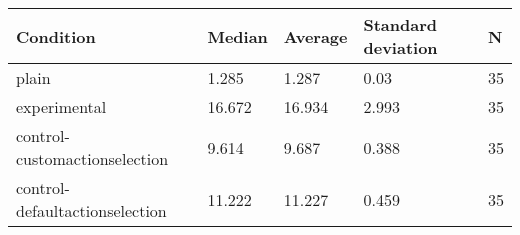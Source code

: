 \begin{center}
\begin{tabular}{|l|l|l|l|l|}
\hline
Condition & Median & Average & Standard deviation & N \\
\hline
plain & 1.285 & 1.287 & 0.03 & 35 \\
experimental & 16.672 & 16.934 & 2.993 & 35 \\
control-customactionselection & 9.614 & 9.687 & 0.388 & 35 \\
control-defaultactionselection & 11.222 & 11.227 & 0.459 & 35 \\
\hline
\end{tabular}
\end{center}
